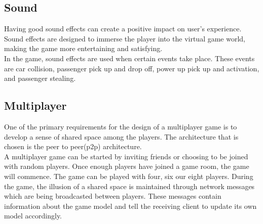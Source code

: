 \subsection*{Sound}
	Having good sound effects can create a positive impact on user's experience. Sound effects are designed to immerse the player into the virtual game world, making the game more entertaining and satisfying.\\
	In the game, sound effects are used when certain events take place. These events are car collision, passenger pick up and drop off, power up pick up and activation, and passenger stealing.


\subsection*{Multiplayer}
One of the primary requirements for the design of a multiplayer game is to develop a sense of shared space among the players. The architecture that is chosen is the peer to peer(p2p) architecture. \\
A multiplayer game can be started by inviting friends or choosing to be joined with random players. Once enough players have joined a game room, the game will commence. The game can be played with four, six our eight players. During the game, the illusion of a shared space is maintained through network messages which are being broadcasted between players. These messages contain information about the game model and tell the receiving client to update its own model accordingly.